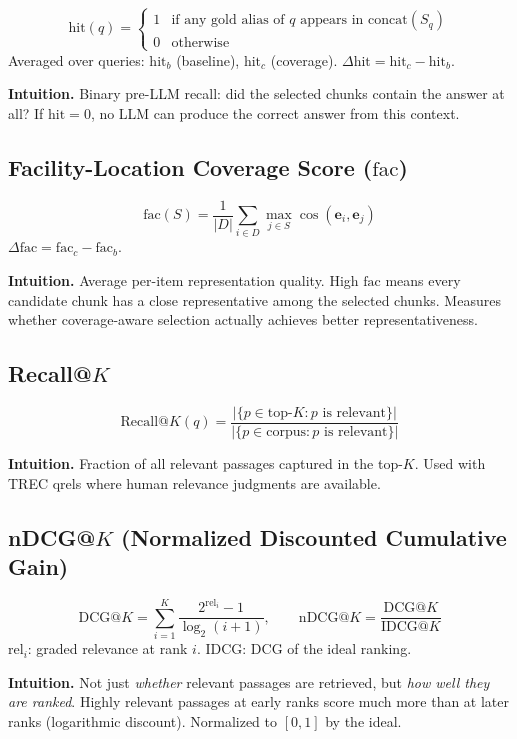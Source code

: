 \documentclass[11pt,a4paper]{article}
\begin{document}
\[
	\mathrm{hit}(q) =
	\begin{cases}
		1 & \text{if any gold alias of } q \text{ appears in } \mathrm{concat}(S_q) \\
		0 & \text{otherwise}
	\end{cases}
\]
Averaged over queries: $\mathrm{hit}_b$ (baseline), $\mathrm{hit}_c$ (coverage). $\Delta\mathrm{hit} = \mathrm{hit}_c - \mathrm{hit}_b$.

\textbf{Intuition.} Binary pre-LLM recall: did the selected chunks contain the answer at all? If $\mathrm{hit}=0$, no LLM can produce the correct answer from this context.

\subsection{Facility-Location Coverage Score ($\mathrm{fac}$)}
\[
	\mathrm{fac}(S) = \frac{1}{|D|} \sum_{i \in D} \max_{j \in S} \cos(\mathbf{e}_i, \mathbf{e}_j)
\]
$\Delta\mathrm{fac} = \mathrm{fac}_c - \mathrm{fac}_b$.

\textbf{Intuition.} Average per-item representation quality. High $\mathrm{fac}$ means every candidate chunk has a close representative among the selected chunks. Measures whether coverage-aware selection actually achieves better representativeness.

\subsection{Recall@$K$}

\[
	\mathrm{Recall@}K(q) = \frac{|\{p \in \text{top-}K : p \text{ is relevant}\}|}{|\{p \in \text{corpus} : p \text{ is relevant}\}|}
\]

\textbf{Intuition.} Fraction of all relevant passages captured in the top-$K$. Used with TREC qrels where human relevance judgments are available.

\subsection{nDCG@$K$ (Normalized Discounted Cumulative Gain)}

\[
	\mathrm{DCG@}K = \sum_{i=1}^{K} \frac{2^{\mathrm{rel}_i} - 1}{\log_2(i+1)}, \qquad
	\mathrm{nDCG@}K = \frac{\mathrm{DCG@}K}{\mathrm{IDCG@}K}
\]
$\mathrm{rel}_i$: graded relevance at rank $i$. IDCG: DCG of the ideal ranking.

\textbf{Intuition.} Not just \emph{whether} relevant passages are retrieved, but \emph{how well they are ranked}. Highly relevant passages at early ranks score much more than at later ranks (logarithmic discount). Normalized to $[0,1]$ by the ideal.
\end{document}
